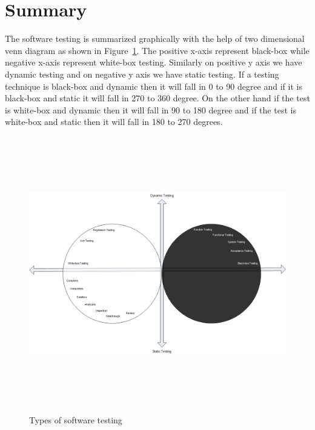 



\section{Summary}
The software testing is summarized graphically with the help of two dimensional venn diagram as shown in Figure~\ref{fig:testDataGenerators_2}. The positive x-axis represent black-box while negative x-axis represent white-box testing. Similarly on positive y axis we have dynamic testing and on negative y axis we have static testing. If a testing technique is black-box and dynamic then it will fall in 0 to 90 degree and if it is black-box and static it will fall in 270 to 360 degree. On the other hand if the test is white-box and dynamic then it will fall in 90 to 180 degree and if the test is white-box and static then it will fall in 180 to 270 degrees.

\begin{figure}[h]
	\centering
	\centerline{\includegraphics[width=16cm, height=12cm ]{chapter2/DrawingTesting.png}}
	\caption{Types of software testing}
	\label{fig:testDataGenerators_2}
\end{figure}


